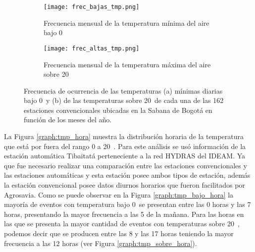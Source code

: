 \begin{figure}[H]
	\begin{subfigure}[b]{\linewidth}
	\begin{center}
    		\caption{Frecuencia mensual de la temperatura mínima del aire bajo 0\celc \ }
	\texttt{[image: frec\_bajas\_tmp.png]}
		

		\label{graph:tmp_bajo_meses}
		
	\end{center}
	\end{subfigure}
	
	\begin{subfigure}[b]{\linewidth}
	\begin{center}
    \caption{Frecuencia mensual de la temperatura máxima del aire sobre 20\celc \ }
	\texttt{[image: frec\_altas\_tmp.png]}
		
		
		\label{graph:tmp_sobre_meses}
		
	\end{center}
	\end{subfigure}
	
	
	\caption{Frecuencia de ocurrencia de las temperaturas (a) mínimas diarias bajo 0\celc \  y (b) de las temperaturas sobre 20\celc \ de cada una de las 162 estaciones convencionales ubicadas en la Sabana de Bogotá en función de los meses del año.}
	\label{graph:tmp_meses}

\end{figure}



La Figura \ref{graph:tmp_hora} muestra la distribución horaria de la temperatura que está por fuera del rango 0 a 20\celc \ . Para este análisis se usó información de la estación automática Tibaitatá perteneciente a la red HYDRAS del IDEAM. Ya que fue necesario realizar una comparación entre las estaciones convencionales y las estaciones automáticas y esta estación posee ambos tipos de estación, además la estación convencional posee datos diurnos horarios que fueron facilitados por Agrosavia. Como se puede observar en la Figura \ref{graph:tmp_bajo_hora} la mayoría de eventos con temperatura bajo 0\celc \  se presentan entre las 0 horas y las 7 horas, presentando la mayor frecuencia a las 5 de la mañana. Para las horas en las que se presenta la mayor cantidad de eventos con temperaturas sobre 20\celc \ , podemos decir que se producen entre las 8 y las 17 horas teniendo la mayor frecuencia a las 12 horas (ver Figura \ref{graph:tmp_sobre_hora}).



